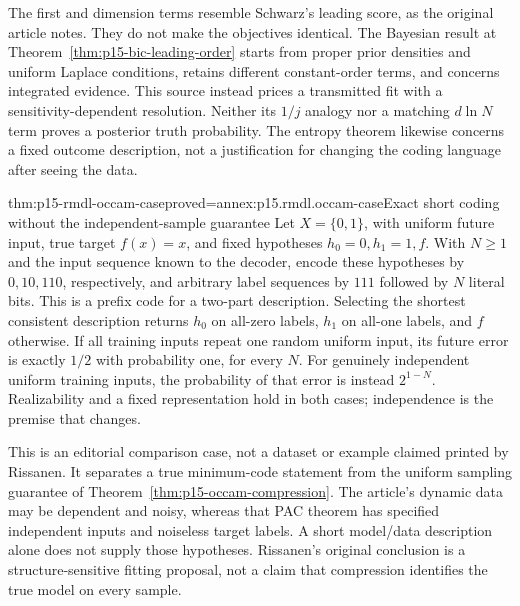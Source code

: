 The first and dimension terms resemble Schwarz's leading score, as the
original article notes. They do not make the objectives identical.
The Bayesian result at Theorem~\ref{thm:p15-bic-leading-order} starts from
proper prior densities and uniform Laplace conditions, retains different
constant-order terms, and concerns integrated evidence. This source instead
prices a transmitted fit with a sensitivity-dependent resolution. Neither
its \(1/j\) analogy nor a matching \(d\ln N\) term proves a posterior
truth probability. The entropy theorem likewise concerns a fixed outcome
description, not a justification for changing the coding language after
seeing the data.

\begin{hbtheorem}{thm:p15-rmdl-occam-case}{proved=annex:p15.rmdl.occam-case}{Exact short coding without the independent-sample guarantee}
Let \(X=\{0,1\}\), with uniform future input, true target \(f(x)=x\),
and fixed hypotheses \(h_0=0,h_1=1,f\). With \(N\geq1\) and the input
sequence known to the decoder, encode these hypotheses by \(0,10,110\),
respectively, and arbitrary label sequences by \(111\) followed by
\(N\) literal bits. This is a prefix code for a two-part description.
Selecting the shortest consistent description returns \(h_0\) on all-zero
labels, \(h_1\) on all-one labels, and \(f\) otherwise.
If all training inputs repeat one random uniform input, its future error
is exactly \(1/2\) with probability one, for every \(N\).
For genuinely independent uniform training inputs, the probability of that
error is instead \(2^{1-N}\). Realizability and a fixed representation
hold in both cases; independence is the premise that changes.
\end{hbtheorem}

This is an editorial comparison case, not a dataset or example claimed
printed by Rissanen. It separates a true minimum-code statement from the
uniform sampling guarantee of Theorem~\ref{thm:p15-occam-compression}.
The article's dynamic data may be dependent and noisy, whereas that PAC
theorem has specified independent inputs and noiseless target labels.
A short model/data description alone does not supply those hypotheses.
Rissanen's original conclusion is a structure-sensitive fitting proposal,
not a claim that compression identifies the true model on every sample.

